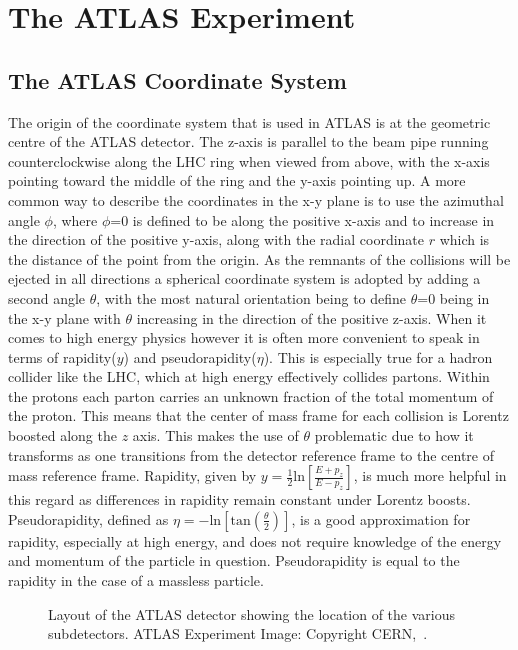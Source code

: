 \section{The ATLAS Experiment}
\label{Sec:ATLAS}

\subsection{The ATLAS Coordinate System}

The origin of the coordinate system that is used in ATLAS is at the geometric centre of the ATLAS detector.  
The z-axis is parallel to the beam pipe running counterclockwise along the LHC ring when viewed from above, with the x-axis pointing toward the middle of the ring and the y-axis pointing up.  
A more common way to describe the coordinates in the x-y plane is to use the azimuthal angle $\phi$, where $\phi$=0 is defined to be along the positive x-axis and to increase in the direction of the positive y-axis, along with the radial coordinate $r$ which is the distance of the point from the origin.  
As the remnants of the collisions will be ejected in all directions a spherical coordinate system is adopted by adding a second angle $\theta$, with the most natural orientation being to define $\theta$=0 being in the x-y plane with $\theta$ increasing in the direction of the positive z-axis.  
When it comes to high energy physics however it is often more convenient to speak in terms of rapidity($y$) and pseudorapidity($\eta$).  
This is especially true for a hadron collider like the LHC, which at high energy effectively collides partons.  
Within the protons each parton carries an unknown fraction of the total momentum of the proton.  
This means that the center of mass frame for each collision is Lorentz boosted along the $z$ axis.  
This makes the use of $\theta$ problematic due to how it transforms as one transitions from the detector reference frame to the centre of mass reference frame.  
Rapidity, given by $y=\frac{1}{2}\mathrm{ln}\left[\frac{E+p_{z}}{E-p_z}\right]$, is much more helpful in this regard as differences in rapidity remain constant under Lorentz boosts.  
Pseudorapidity, defined as $\eta=-\mathrm{ln}\left[\mathrm{tan}\left(\frac{\theta}{2}\right)\right]$, is a good approximation for rapidity, especially at high energy, and does not require knowledge of the energy and momentum of the particle in question.  
Pseudorapidity is equal to the rapidity in the case of a massless particle.  

\begin{figure}[!ht]
  \begin{center}
  \end{center}
  \caption[Layout of the ATLAS detector]
  {\small Layout of the ATLAS detector showing the location of the various subdetectors.  ATLAS Experiment Image: Copyright CERN,~\cite{Pequenao:1095924}.}
\end{figure}

